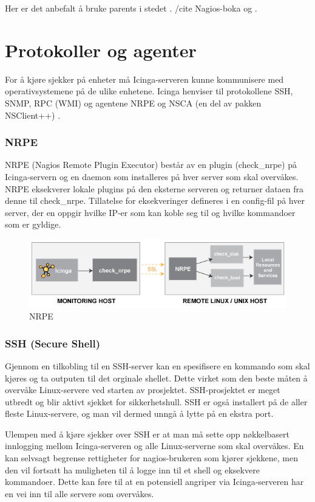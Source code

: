 Her er det anbefalt å bruke parents i stedet \cite{hostandservicedep}. /cite Nagios-boka og .

\section{Protokoller og agenter}
For å kjøre sjekker på enheter må Icinga-serveren kunne kommunisere med operativsystemene på de ulike enhetene. Icinga henviser til protokollene SSH, SNMP, RPC (WMI) og agentene NRPE og NSCA (en del av pakken NSClient++) \cite{icingaintegration} \cite{icingaadditionalsoftware}. 

\subsubsection{NRPE}
NRPE (Nagios Remote Plugin Executor) består av en plugin (check\_nrpe) på Icinga-servern og en daemon som installeres på hver server som skal overvåkes. NRPE eksekverer lokale plugins på den eksterne serveren og returner dataen fra denne til check\_nrpe. Tillatelse for eksekveringer defineres i en config-fil på hver server, der en oppgir hvilke IP-er som kan koble seg til og hvilke kommandoer som er gyldige. 

\begin{figure}
    \centering
    \includegraphics[scale=0.6]{img/nrpe.png}
    \caption{NRPE}
    \label{nrpe}
\end{figure}


\subsubsection{SSH (Secure Shell)}

Gjennom en tilkobling til en SSH-server kan en spesifisere en kommando som skal kjøres og ta outputen til det orginale shellet. Dette virket som den beste måten å overvåke Linux-servere ved starten av prosjektet. SSH-prosjektet er meget utbredt og blir aktivt sjekket for sikkerhetshull. SSH er også installert på de aller fleste Linux-servere, og man vil dermed unngå å lytte på en ekstra port. 

Ulempen med å kjøre sjekker over SSH er at man må sette opp nøkkelbasert innlogging mellom Icinga-serveren og alle Linux-serverne som skal overvåkes. En kan selvsagt begrense rettigheter for nagios-brukeren som kjører sjekkene, men den vil fortsatt ha muligheten til å logge inn til et shell og eksekvere kommandoer. Dette kan føre til at en potensiell angriper via Icinga-serveren har en vei inn til alle servere som overvåkes.

